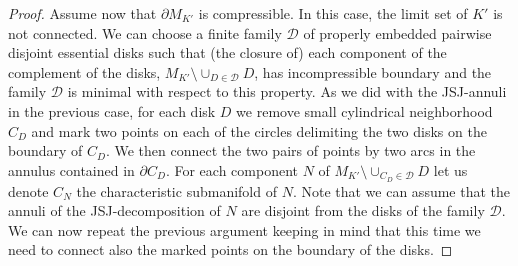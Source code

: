 \documentclass[11pt]{article}
\theoremstyle{definition}
\begin{document}
\begin{proof}
Assume now that $\partial M_{K'}$ is compressible. In this case, the limit set of $K'$ is not connected. We can choose a finite family $\mathcal{D}$ of properly embedded pairwise disjoint essential disks such that (the closure of) each component of the complement of the disks, $M_{K'}\setminus\cup_{D\in{\mathcal{D}}}D$, has incompressible boundary and the family ${\mathcal{D}}$ is minimal with respect to this property. 
As we did with the JSJ-annuli in the previous case, for each disk $D$ we remove small cylindrical neighborhood $C_D$ and mark two points on each of the circles delimiting the two disks on the boundary of $C_D$. We then connect the two pairs of points by two arcs in the annulus contained in $\partial C_D$.
For each component $N$ of $M_{K'}\setminus\cup_{C_D\in{\mathcal{D}}}D$ let us denote $C_N$ the characteristic submanifold of $N$. Note that we can assume that the annuli of the JSJ-decomposition of $N$ are disjoint from the disks of the family ${\mathcal{D}}$. We can now repeat the previous argument keeping in mind that this time we need to connect also the marked points on the boundary of the disks.  
 \end{proof} 
 
 
\end{document}
